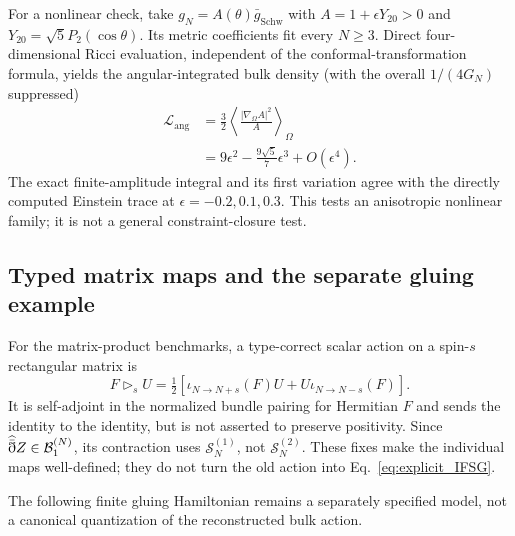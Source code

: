 For a nonlinear check, take $g_N=A(\theta)\bar g_{\mathrm{Schw}}$ with $A=1+\epsilon Y_{20}>0$ and $Y_{20}=\sqrt5P_2(\cos\theta)$. Its metric coefficients fit every $N\ge3$. Direct four-dimensional Ricci evaluation, independent of the conformal-transformation formula, yields the angular-integrated bulk density (with the overall $1/(4G_N)$ suppressed)
\begin{align}
\mathcal L_{\mathrm{ang}}&=\frac32\left\langle\frac{|\nabla_\Omega A|^2}{A}\right\rangle_\Omega\nonumber\\
&=9\epsilon^2-\frac{9\sqrt5}{7}\epsilon^3+O(\epsilon^4).
\end{align}
The exact finite-amplitude integral and its first variation agree with the directly computed Einstein trace at $\epsilon=-0.2,0.1,0.3$. This tests an anisotropic nonlinear family; it is not a general constraint-closure test.

\subsection{Typed matrix maps and the separate gluing example}

For the matrix-product benchmarks, a type-correct scalar action on a spin-$s$ rectangular matrix is
\begin{equation}
F\mathbin{\triangleright_s}U=\tfrac12[\iota_{N\to N+s}(F)U+U\iota_{N\to N-s}(F)].
\end{equation}
It is self-adjoint in the normalized bundle pairing for Hermitian $F$ and sends the identity to the identity, but is not asserted to preserve positivity. Since $\widehat{\bar{\eth}}Z\in\mathcal{B}_1^{(N)}$, its contraction uses $\mathcal S_N^{(1)}$, not $\mathcal S_N^{(2)}$. These fixes make the individual maps well-defined; they do not turn the old action into Eq.~\eqref{eq:explicit_IFSG}.

The following finite gluing Hamiltonian remains a separately specified model, not a canonical quantization of the reconstructed bulk action.
